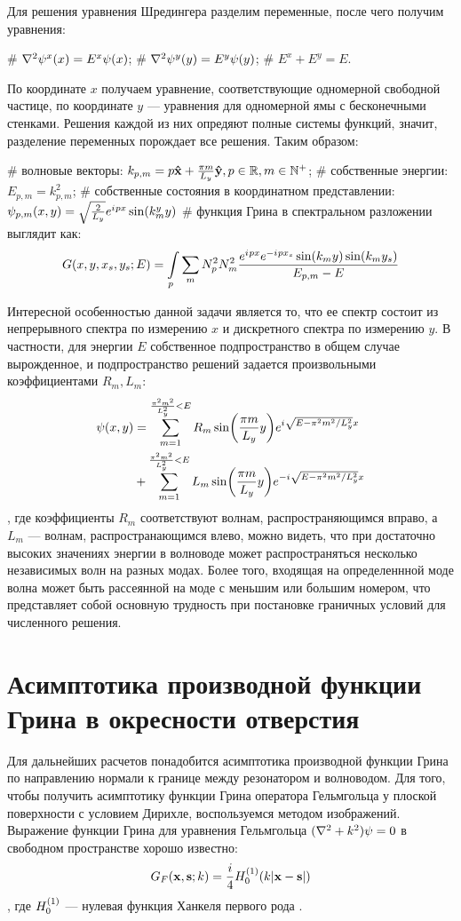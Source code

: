 Для решения уравнения Шредингера разделим переменные, после чего получим уравнения:
\begin{ilist}
# $\laplacian \psi^x(x) = E^x \psi(x)$;
# $\laplacian \psi^y(y) = E^y \psi(y)$;
# $E^x + E^y = E$.
\end{ilist}
По координате $x$ получаем уравнение, соответствующие одномерной свободной частице, по координате $y$ — уравнения для одномерной ямы с бесконечными стенками. Решения каждой из них опредяют полные системы функций, значит, разделение переменных порождает все решения. Таким образом:
\begin{ilist}
# волновые векторы: $k_{p, m} = p \vb{\hat{x}} + \frac{\pi m}{L_y} \vb{\hat{y}}, p \in \mathbb{R}, m \in \mathbb{N}^+$;
# собственные энергии: $E_{p, m} = k_{p, m}^2$;
# собственные состояния в координатном представлении: $\psi_{p, m}(x, y) = \sqrt{\frac{2}{L_y}} e^{{i\mkern1mu} p x} \sin(k^y_m y)$
# функция Грина в спектральном разложении выглядит как: 
\[
G(x, y, x_s, y_s; E) = \int\limits_p \sum\limits_m N_p^2 N_m^2 \frac{e^{{i\mkern1mu} p x} e^{-{i\mkern1mu} p x_s} \sin(k_m y) \sin(k_m y_s)}{E_{p, m} - E}
\]
\end{ilist}
Интересной особенностью данной задачи является то, что ее спектр состоит из непрерывного спектра по измерению $x$ и дискретного спектра по измерению $y$. В частности, для энергии $E$ собственное подпространство в общем случае вырожденное, и подпространство решений задается произвольными коэффициентами $R_m, L_m$:
\begin{align*}
\psi(x, y)
& = \sum\limits_{m = 1}^{\frac{\pi^2 m^2}{L_y^2} < E} R_m \sin(\frac{\pi m}{L_y} y) e^{{i\mkern1mu} \sqrt{E - \pi^2 m^2 / L_y^2} x} \\
& + \sum\limits_{m = 1}^{\frac{\pi^2 m^2}{L_y^2} < E} L_m \sin(\frac{\pi m}{L_y} y) e^{-{i\mkern1mu} \sqrt{E - \pi^2 m^2 / L_y^2} x}
\end{align*}
, где коэффициенты $R_m$ соответствуют волнам, распространяющимся вправо, а $L_m$ — волнам, распространающимся влево, можно видеть, что при достаточно высоких значениях энергии в волноводе может распространяться несколько независимых волн на разных модах. Более того, входящая на определеннной моде волна может быть рассеянной на моде с меньшим или большим номером, что представляет собой основную трудность при постановке граничных условий для численного решения.

\section{Асимптотика производной функции Грина в окресности отверстия}
Для дальнейших расчетов понадобится асимптотика производной функции Грина по направлению нормали к границе между резонатором и волноводом. Для того, чтобы получить асимптотику функции Грина оператора Гельмгольца у плоской поверхности с условием Дирихле, воспользуемся методом изображений. Выражение функции Грина для уравнения Гельмгольца $(\laplacian + k^2) \psi = 0$ в свободном пространстве хорошо известно:
\[
G_F(\vb{x}, \vb{s}; k) = \frac{i}{4} H_{0}^{(1)}(k |\vb{x} - \vb{s}|)
\],
где $H_{0}^{(1)}$ — нулевая функция Ханкеля первого рода \cite{hankel_first_kind}.


